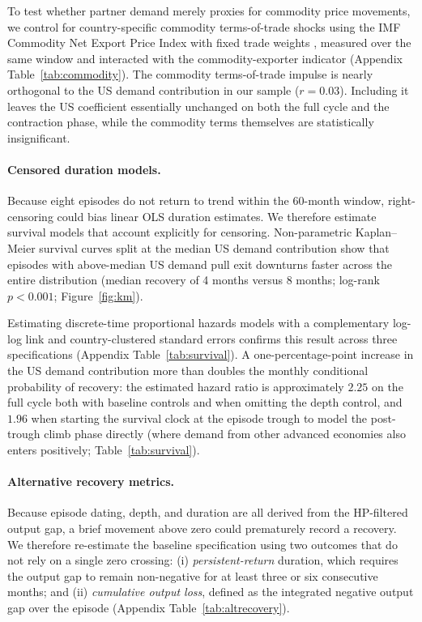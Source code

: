 \documentclass[12pt, a4paper]{article}
\begin{document}
To test whether partner demand merely proxies for commodity price movements, we control for country-specific commodity terms-of-trade shocks using the IMF Commodity Net Export Price Index with fixed trade weights \citep{gruss2019}, measured over the same window and interacted with the commodity-exporter indicator (Appendix Table~\ref{tab:commodity}). The commodity terms-of-trade impulse is nearly orthogonal to the US demand contribution in our sample ($r=0.03$). Including it leaves the US coefficient essentially unchanged on both the full cycle and the contraction phase, while the commodity terms themselves are statistically insignificant.

\paragraph{Censored duration models.} Because eight episodes do not return to trend within the 60-month window, right-censoring could bias linear OLS duration estimates. We therefore estimate survival models that account explicitly for censoring. Non-parametric Kaplan--Meier survival curves split at the median US demand contribution show that episodes with above-median US demand pull exit downturns faster across the entire distribution (median recovery of 4 months versus 8 months; log-rank $p<0.001$; Figure~\ref{fig:km}).

Estimating discrete-time proportional hazards models with a complementary log-log link and country-clustered standard errors confirms this result across three specifications (Appendix Table~\ref{tab:survival}). A one-percentage-point increase in the US demand contribution more than doubles the monthly conditional probability of recovery: the estimated hazard ratio is approximately $2.25$ on the full cycle both with baseline controls and when omitting the depth control, and $1.96$ when starting the survival clock at the episode trough to model the post-trough climb phase directly (where demand from other advanced economies also enters positively; Table~\ref{tab:survival}).

\paragraph{Alternative recovery metrics.} Because episode dating, depth, and duration are all derived from the HP-filtered output gap, a brief movement above zero could prematurely record a recovery. We therefore re-estimate the baseline specification using two outcomes that do not rely on a single zero crossing: (i) \emph{persistent-return} duration, which requires the output gap to remain non-negative for at least three or six consecutive months; and (ii) \emph{cumulative output loss}, defined as the integrated negative output gap over the episode (Appendix Table~\ref{tab:altrecovery}).
\end{document}

